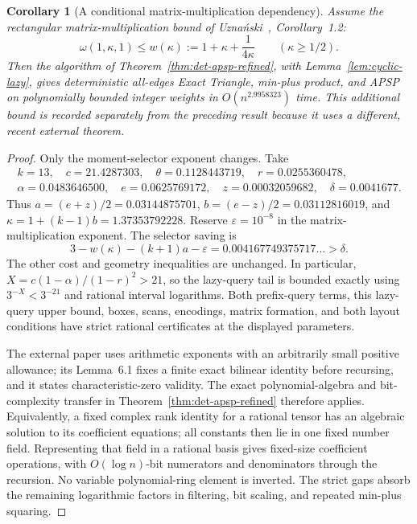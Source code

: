 \documentclass[11pt]{article}
\newtheorem{corollary}[theorem]{Corollary}
\begin{document}
\begin{corollary}[A conditional matrix-multiplication dependency]
\label{cor:det-apsp-recent-mm}
Assume the rectangular matrix-multiplication bound of
Uzna\'nski~\cite{U26}, Corollary~1.2:
\[
\omega(1,\kappa,1)\le w(\kappa):=1+\kappa+\frac1{4\kappa}
\qquad(\kappa\ge1/2).
\]
Then the algorithm of Theorem~\ref{thm:det-apsp-refined}, with
Lemma~\ref{lem:cyclic-lazy}, gives deterministic all-edges Exact Triangle,
min-plus product, and APSP on polynomially bounded integer weights in
$O(n^{2.9958323})$ time. This additional bound is recorded separately from
the preceding result because it uses a different, recent external theorem.
\end{corollary}
\begin{proof}
Only the moment-selector exponent changes. Take
\[
\begin{gathered}
k=13,\quad c=21.4287303,\quad\theta=0.1128443719,\quad
r=0.0255360478,\\
\alpha=0.0483646500,\quad e=0.0625769172,\quad z=0.00032059682,
\quad\delta=0.0041677.
\end{gathered}
\]
Thus $a=(e+z)/2=0.03144875701$,
$b=(e-z)/2=0.03112816019$, and
$\kappa=1+(k-1)b=1.37353792228$.
Reserve $\varepsilon=10^{-8}$ in the matrix-multiplication exponent.
The selector saving is
\[
3-w(\kappa)-(k+1)a-\varepsilon
=0.004167749375717\ldots>\delta.
\]
The other cost and geometry inequalities are unchanged. In particular,
$X=c(1-\alpha)/(1-r)^2>21$, so the lazy-query tail is bounded exactly
using $3^{-X}<3^{-21}$ and rational interval logarithms.
Both prefix-query terms, this lazy-query upper bound, boxes, scans,
encodings, matrix formation, and both layout conditions have strict
rational certificates at the displayed parameters.

The external paper uses arithmetic exponents with an arbitrarily small
positive allowance; its Lemma~6.1 fixes a finite exact bilinear identity
before recursing, and it states characteristic-zero validity.
The exact polynomial-algebra and bit-complexity transfer in
Theorem~\ref{thm:det-apsp-refined} therefore applies. Equivalently, a fixed
complex rank identity for a rational tensor has an algebraic solution to
its coefficient equations; all constants then lie in one fixed number
field. Representing that field in a rational basis gives fixed-size
coefficient operations, with $O(\log n)$-bit numerators and denominators
through the recursion. No variable polynomial-ring element is inverted.
The strict gaps absorb the remaining logarithmic factors in filtering,
bit scaling, and repeated min-plus squaring.
\end{proof}
\end{document}
